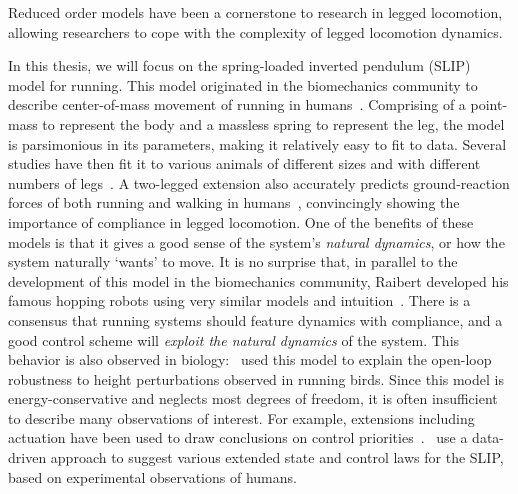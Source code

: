 Reduced order models have been a cornerstone to research in legged locomotion, allowing researchers to cope with the complexity of legged locomotion dynamics. \par
In this thesis, we will focus on the spring-loaded inverted pendulum (SLIP) model for running. This model originated in the biomechanics community to describe center-of-mass movement of running in humans~\cite{blickhan1989spring}. Comprising of a point-mass to represent the body and a massless spring to represent the leg, the model is parsimonious in its parameters, making it relatively easy to fit to data.
Several studies have then fit it to various animals of different sizes and with different numbers of legs~\cite{blickhan1993similarity,daley2006running,jindrich2002dynamic}. A two-legged extension also accurately predicts ground-reaction forces of both running and walking in humans~\cite{geyer2006compliant}, convincingly showing the importance of compliance in legged locomotion.
One of the benefits of these models is that it gives a good sense of the system's \emph{natural dynamics}, or how the system naturally `wants' to move.
It is no surprise that, in parallel to the development of this model in the biomechanics community, Raibert developed his famous hopping robots using very similar models and intuition~\cite[See Figure 2.5]{raibert1986legged}.
There is a consensus that running systems should feature dynamics with compliance, and a good control scheme will \emph{exploit the natural dynamics} of the system.
This behavior is also observed in biology:~\textcite{daley2006running} used this model to explain the open-loop robustness to height perturbations observed in running birds.
Since this model is energy-conservative and neglects most degrees of freedom, it is often insufficient to describe many observations of interest. For example, extensions including actuation have been used to draw conclusions on control priorities~\cite{Birn-Jeffery3786,blum2014swing}.~\textcite{maus2015constructing} use a data-driven approach to suggest various extended state and control laws for the SLIP, based on experimental observations of humans. %

